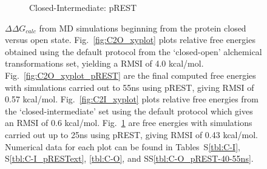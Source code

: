 \begin{figure}[!ht]
\begin{subfigure}{.5\textwidth}
   \caption{Closed-Intermediate: pREST}
   \label{fig:C2I_xyplot_pREST}
\end{subfigure}\hfill
\caption{$\Delta\Delta G_{calc}$ from MD simulations beginning from the protein closed versus open state. 
Fig.~\ref{fig:C2O_xyplot} plots relative free energies obtained using the default protocol from the `closed-open' alchemical transformations set, yielding a RMSI of 4.0 kcal/mol. 
Fig.~\ref{fig:C2O_xyplot_pREST} are the final computed free energies with simulations carried out to 55ns using pREST, giving RMSI of 0.57 kcal/mol. 
Fig.~\ref{fig:C2I_xyplot} plots relative free energies from the `closed-intermediate' set using the default protocol which gives an RMSI of 0.6 kcal/mol. 
Fig.~\ref{fig:C2I_xyplot_pREST} are free energies with simulations carried out up to 25ns using pREST, giving RMSI of 0.43 kcal/mol. 
Numerical data for each plot can be found in Tables~S\ref{tbl:C-I}, S\ref{tbl:C-I_pRESText}, \ref{tbl:C-O}, and SS\ref{tbl:C-O_pREST-40-55ns}.
}
\label{fig:conf-xyplots}
\end{figure}


